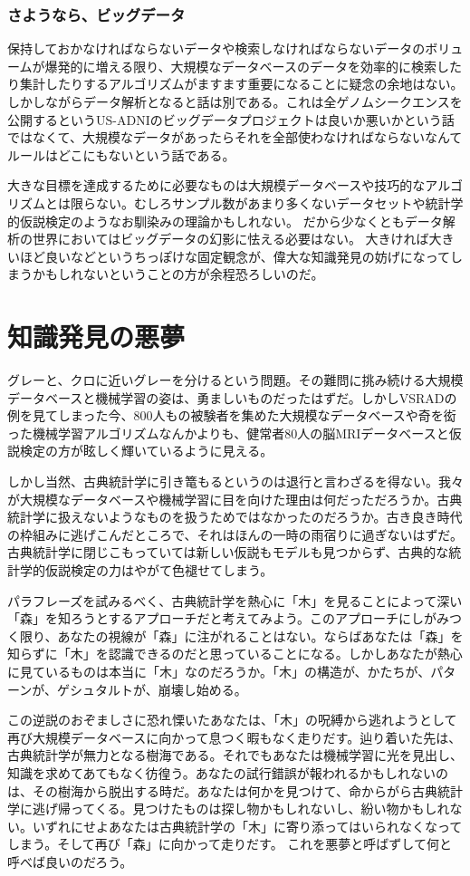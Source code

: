 \subsubsection{さようなら、ビッグデータ}
保持しておかなければならないデータや検索しなければならないデータのボリュームが爆発的に増える限り、大規模なデータベースのデータを効率的に検索したり集計したりするアルゴリズムがますます重要になることに疑念の余地はない。
しかしながらデータ解析となると話は別である。これは全ゲノムシークエンスを公開するというUS-ADNIのビッグデータプロジェクトは良いか悪いかという話ではなくて、大規模なデータがあったらそれを全部使わなければならないなんてルールはどこにもないという話である。

大きな目標を達成するために必要なものは大規模データベースや技巧的なアルゴリズムとは限らない。むしろサンプル数があまり多くないデータセットや統計学的仮説検定のようなお馴染みの理論かもしれない。
だから少なくともデータ解析の世界においてはビッグデータの幻影に怯える必要はない。
大きければ大きいほど良いなどというちっぽけな固定観念が、偉大な知識発見の妨げになってしまうかもしれないということの方が余程恐ろしいのだ。

\section{知識発見の悪夢}
グレーと、クロに近いグレーを分けるという問題。その難問に挑み続ける大規模データベースと機械学習の姿は、勇ましいものだったはずだ。しかしVSRADの例を見てしまった今、800人もの被験者を集めた大規模なデータベースや奇を衒った機械学習アルゴリズムなんかよりも、健常者80人の脳MRIデータベースと仮説検定の方が眩しく輝いているように見える。

しかし当然、古典統計学に引き篭もるというのは退行と言わざるを得ない。我々が大規模なデータベースや機械学習に目を向けた理由は何だっただろうか。古典統計学に扱えないようなものを扱うためではなかったのだろうか。古き良き時代の枠組みに逃げこんだところで、それはほんの一時の雨宿りに過ぎないはずだ。
古典統計学に閉じこもっていては新しい仮説もモデルも見つからず、古典的な統計学的仮説検定の力はやがて色褪せてしまう。

パラフレーズを試みるべく、古典統計学を熱心に「木」を見ることによって深い「森」を知ろうとするアプローチだと考えてみよう。このアプローチにしがみつく限り、あなたの視線が「森」に注がれることはない。ならばあなたは「森」を知らずに「木」を認識できるのだと思っていることになる。しかしあなたが熱心に見ているものは本当に「木」なのだろうか。「木」の構造が、かたちが、パターンが、ゲシュタルトが、崩壊し始める。

この逆説のおぞましさに恐れ慄いたあなたは、「木」の呪縛から逃れようとして再び大規模データベースに向かって息つく暇もなく走りだす。辿り着いた先は、古典統計学が無力となる樹海である。それでもあなたは機械学習に光を見出し、知識を求めてあてもなく彷徨う。あなたの試行錯誤が報われるかもしれないのは、その樹海から脱出する時だ。あなたは何かを見つけて、命からがら古典統計学に逃げ帰ってくる。見つけたものは探し物かもしれないし、紛い物かもしれない。いずれにせよあなたは古典統計学の「木」に寄り添ってはいられなくなってしまう。そして再び「森」に向かって走りだす。
これを悪夢と呼ばずして何と呼べば良いのだろう。

